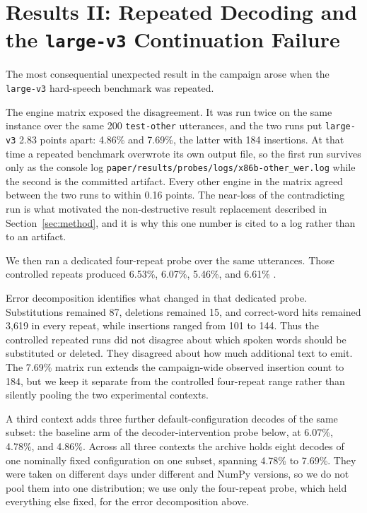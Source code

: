 \section{Results II: Repeated Decoding and the \texttt{large-v3} Continuation Failure}
\label{sec:repro}

The most consequential unexpected result in the campaign arose when the
\texttt{large-v3} hard-speech benchmark was repeated.

The engine matrix exposed the disagreement. It was run twice on the same instance over the same
200 \texttt{test-other} utterances, and the two runs put \texttt{large-v3} 2.83 \wer{} points
apart: 4.86\% and 7.69\%, the latter with 184 insertions. At that time a repeated benchmark
overwrote its own output file, so the first run survives only as the console log
\texttt{paper/results/probes/logs/x86b-other\_wer.log} while the second is the committed
artifact. Every other engine in the matrix agreed between the two runs to within 0.16 points.
The near-loss of the contradicting run is what motivated the non-destructive result
replacement described in Section~\ref{sec:method}, and it is why this one number is cited to a
log rather than to an artifact.

We then ran a dedicated four-repeat probe over the same utterances. Those controlled repeats
produced 6.53\%, 6.07\%, 5.46\%, and 6.61\% \wer{}.

Error decomposition identifies what changed in that dedicated probe. Substitutions remained 87,
deletions remained 15, and correct-word hits remained 3,619 in every repeat, while insertions
ranged from 101 to 144. Thus the controlled repeated runs did not disagree about which spoken
words should be substituted or deleted. They disagreed about how much additional text to emit.
The 7.69\% matrix run extends the campaign-wide observed insertion count to 184, but we keep it
separate from the controlled four-repeat range rather than silently pooling the two experimental
contexts.

A third context adds three further default-configuration decodes of the same subset: the
baseline arm of the decoder-intervention probe below, at 6.07\%, 4.78\%, and 4.86\%. Across all
three contexts the archive holds eight decodes of one nominally fixed
configuration on one subset, spanning 4.78\% to 7.69\%. They were taken on different days under
different \YazSes{} and NumPy versions, so we do not pool them into one distribution; we use
only the four-repeat probe, which held everything else fixed, for the error decomposition above.

